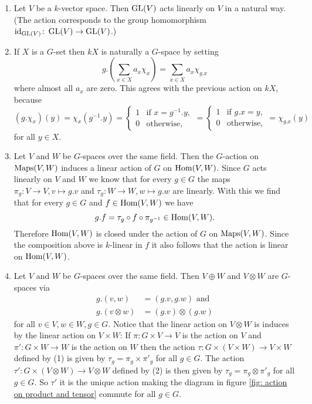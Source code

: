 \begin{expls}
 \begin{enumerate}[label=\emph{\alph*)},leftmargin=*]
  \item
   Let $V$ be a $k$-vector space. Then $\operatorname{GL}(V)$ acts linearly on $V$ in a natural way. (The action corresponds to the group homomorphism $\operatorname{id}_{\operatorname{GL}(V)} \colon \operatorname{GL}(V) \to \operatorname{GL}(V)$.)
  \item
   If $X$ is a $G$-set then $kX$ is naturally a $G$-space by setting
   \[
    g.\left(\sum_{x \in X} a_x \chi_x\right) = \sum_{x \in X} a_x \chi_{g.x}
   \]
   where almost all $a_x$ are zero. This agrees with the previous action on $kX$, because
   \[
    (g.\chi_x)(y)
    = \chi_x(g^{-1}.y)
    = \begin{cases} 1 & \text{if } x = g^{-1}.y, \\ 0 & \text{otherwise}, \end{cases}
    = \begin{cases} 1 & \text{if } g.x = y, \\ 0 & \text{otherwise}, \end{cases}
    = \chi_{g.x}(y)
   \]
   for all $y \in X$.
  \item
   Let $V$ and $W$ be $G$-spaces over the same field. Then the $G$-action on $\operatorname{Maps}(V,W)$ induces a linear action of $G$ on $\operatorname{Hom}(V,W)$. Since $G$ acts linearly on $V$ and $W$ we know that for every $g \in G$ the maps $\pi_g \colon V \to V, v \mapsto g.v$ and $\tau_g \colon W \to W, w \mapsto g.w$ are linearly. With this we find that for every $g \in G$ and $f \in \operatorname{Hom}(V,W)$ we have
   \[
    g.f = \tau_g \circ f \circ \pi_{g^{-1}} \in \operatorname{Hom}(V,W).
   \]
   Therefore $\operatorname{Hom}(V,W)$ is closed under the action of $G$ on $\operatorname{Maps}(V,W)$. Since the composition above is $k$-linear in $f$ it also follows that the action is linear on $\operatorname{Hom}(V,W)$.
  \item
   Let $V$ and $W$ be $G$-spaces over the same field. Then $V \oplus W$ and $V \otimes W$ are $G$-spaces via
   \begin{align*}
    g.(v,w) &= (g.v,g.w) \text{ and }  \tag{1} \\
    g.(v \otimes w) &= (g.v) \otimes (g.w) \tag{2}
   \end{align*}
   for all $v \in V, w \in W, g \in G$. 
   Notice that the linear action on $V \otimes W$ is induces by the linear action on $V \times W$: If $\pi \colon G \times V \to V$ is the action on $V$ and $\pi' \colon G \times W \to W$ is the action on $W$ then the action $\tau \colon G \times (V \times W) \to V \times W$ defined by (1) is given by $\tau_g = \pi_g \times \pi'_g$ for all $g \in G$. The action $\tau' \colon G \times (V \otimes W) \to V \otimes W$ defined by (2) is then given by $\tau_g = \pi_g \otimes \pi'_g$ for all $g \in G$. So $\tau'$ it is the unique action making the diagram in figure \ref{fig: action on product and tensor} commute for all $g \in G$.

\end{enumerate}
\end{expls}
